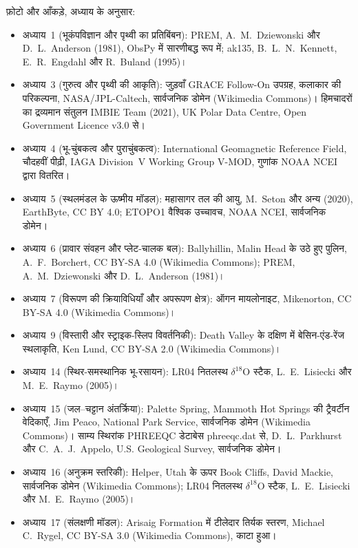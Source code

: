 \bigskip
\noindent फ़ोटो और आँकड़े, अध्याय के अनुसार:
\begin{itemize}\small\setlength{\emergencystretch}{2em}
  \item अध्याय~1 (भूकंपविज्ञान और पृथ्वी का प्रतिबिंबन): PREM, A.~M.~Dziewonski और D.~L.~Anderson (1981), ObsPy में सारणीबद्ध रूप में; ak135, B.~L.~N.~Kennett, E.~R.~Engdahl और R.~Buland (1995)।
  \item अध्याय~3 (गुरुत्व और पृथ्वी की आकृति): जुड़वाँ GRACE Follow-On उपग्रह, कलाकार की परिकल्पना, NASA/JPL-Caltech, सार्वजनिक डोमेन (Wikimedia Commons)। हिमचादरों का द्रव्यमान संतुलन IMBIE Team (2021), UK Polar Data Centre, Open Government Licence v3.0 से।
  \item अध्याय~4 (भू-चुंबकत्व और पुराचुंबकत्व): International Geomagnetic Reference Field, चौदहवीं पीढ़ी, IAGA Division~V Working Group V-MOD, गुणांक NOAA NCEI द्वारा वितरित।
  \item अध्याय~5 (स्थलमंडल के ऊष्मीय मॉडल): महासागर तल की आयु, M.~Seton और अन्य (2020), EarthByte, CC BY 4.0; ETOPO1 वैश्विक उच्चावच, NOAA NCEI, सार्वजनिक डोमेन।
  \item अध्याय~6 (प्रावार संवहन और प्लेट-चालक बल): Ballyhillin, Malin Head के उठे हुए पुलिन, A.~F.~Borchert, CC BY-SA 4.0 (Wikimedia Commons); PREM, A.~M.~Dziewonski और D.~L.~Anderson (1981)।
  \item अध्याय~7 (विरूपण की क्रियाविधियाँ और अपरूपण क्षेत्र): ऑगन मायलोनाइट, Mikenorton, CC BY-SA 4.0 (Wikimedia Commons)।
  \item अध्याय~9 (विस्तारी और स्ट्राइक-स्लिप विवर्तनिकी): Death Valley के दक्षिण में बेसिन-एंड-रेंज स्थलाकृति, Ken Lund, CC BY-SA 2.0 (Wikimedia Commons)।
  \item अध्याय~14 (स्थिर-समस्थानिक भू-रसायन): LR04 नितलस्थ $\delta^{18}$O स्टैक, L.~E.~Lisiecki और M.~E.~Raymo (2005)।
  \item अध्याय~15 (जल--चट्टान अंतर्क्रिया): Palette Spring, Mammoth Hot Springs की ट्रैवर्टीन वेदिकाएँ, Jim Peaco, National Park Service, सार्वजनिक डोमेन (Wikimedia Commons)। साम्य स्थिरांक PHREEQC डेटाबेस phreeqc.dat से, D.~L.~Parkhurst और C.~A.~J.~Appelo, U.S. Geological Survey, सार्वजनिक डोमेन।
  \item अध्याय~16 (अनुक्रम स्तरिकी): Helper, Utah के ऊपर Book Cliffs, David Mackie, सार्वजनिक डोमेन (Wikimedia Commons); LR04 नितलस्थ $\delta^{18}$O स्टैक, L.~E.~Lisiecki और M.~E.~Raymo (2005)।
  \item अध्याय~17 (संलक्षणी मॉडल): Arisaig Formation में टीलेदार तिर्यक स्तरण, Michael C.~Rygel, CC BY-SA 3.0 (Wikimedia Commons), काटा हुआ।

\end{itemize}
